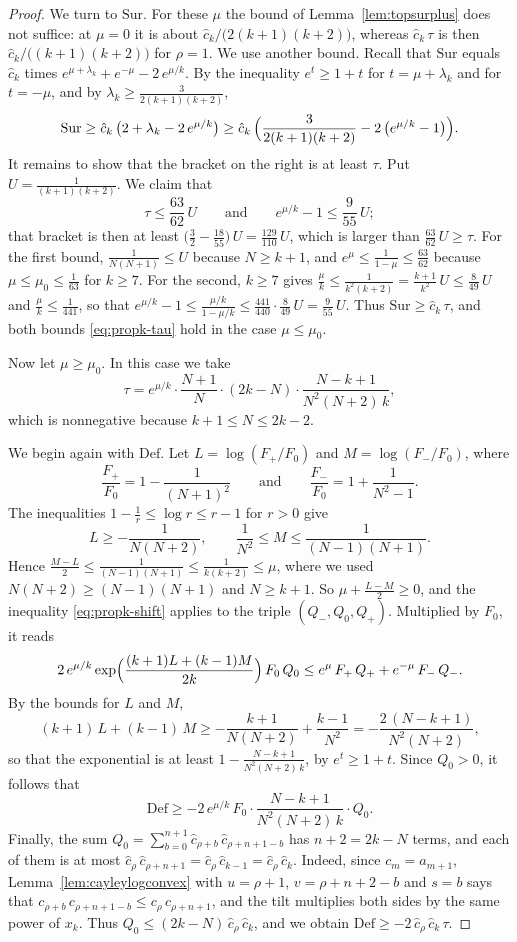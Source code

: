 \documentclass{amsart}
\theoremstyle{definition}
\theoremstyle{remark}
\numberwithin{equation}{section}
\begin{document}
\begin{proof}
We turn to $\mathrm{Sur}$. For these $\mu$ the bound of Lemma~\ref{lem:topsurplus} does not suffice: at $\mu=0$ it is about $\hat c_k/\bigl(2(k+1)(k+2)\bigr)$, whereas $\hat c_k\,\tau$ is then $\hat c_k/\bigl((k+1)(k+2)\bigr)$ for $\rho=1$. We use another bound. Recall that $\mathrm{Sur}$ equals $\hat c_k$ times $e^{\mu+\lambda_k}+e^{-\mu}-2\,e^{\mu/k}$. By the inequality $e^{t}\ge 1+t$ for $t=\mu+\lambda_k$ and for $t=-\mu$, and by $\lambda_k\ge\frac{3}{2(k+1)(k+2)}$,
\[
\mathrm{Sur}\ge\hat c_k\,\bigl(2+\lambda_k-2\,e^{\mu/k}\bigr)\ge\hat c_k\,\Bigl(\frac{3}{2(k+1)(k+2)}-2\,\bigl(e^{\mu/k}-1\bigr)\Bigr).
\]
It remains to show that the bracket on the right is at least $\tau$. Put $U=\frac{1}{(k+1)(k+2)}$. We claim that
\[
\tau\le\frac{63}{62}\,U\qquad\text{and}\qquad e^{\mu/k}-1\le\frac{9}{55}\,U;
\]
that bracket is then at least $\bigl(\frac32-\frac{18}{55}\bigr)\,U=\frac{129}{110}\,U$, which is larger than $\frac{63}{62}\,U\ge\tau$. For the first bound, $\frac{1}{N(N+1)}\le U$ because $N\ge k+1$, and $e^{\mu}\le\frac{1}{1-\mu}\le\frac{63}{62}$ because $\mu\le\mu_0\le\frac1{63}$ for $k\ge 7$. For the second, $k\ge 7$ gives $\frac{\mu}{k}\le\frac{1}{k^2(k+2)}=\frac{k+1}{k^2}\,U\le\frac{8}{49}\,U$ and $\frac{\mu}{k}\le\frac{1}{441}$, so that $e^{\mu/k}-1\le\frac{\mu/k}{1-\mu/k}\le\frac{441}{440}\cdot\frac{8}{49}\,U=\frac{9}{55}\,U$. Thus $\mathrm{Sur}\ge\hat c_k\,\tau$, and both bounds \eqref{eq:propk-tau} hold in the case $\mu\le\mu_0$.

Now let $\mu\ge\mu_0$. In this case we take
\[
\tau=e^{\mu/k}\cdot\frac{N+1}{N}\cdot(2k-N)\cdot\frac{N-k+1}{N^2(N+2)\,k},
\]
which is nonnegative because $k+1\le N\le 2k-2$.

We begin again with $\mathrm{Def}$. Let $L=\log(F_+/F_0)$ and $M=\log(F_-/F_0)$, where
\[
\frac{F_+}{F_0}=1-\frac{1}{(N+1)^2}\qquad\text{and}\qquad\frac{F_-}{F_0}=1+\frac{1}{N^2-1}.
\]
The inequalities $1-\frac1r\le\log r\le r-1$ for $r>0$ give
\[
L\ge-\frac{1}{N(N+2)},\qquad\frac{1}{N^2}\le M\le\frac{1}{(N-1)(N+1)}.
\]
Hence $\frac{M-L}{2}\le\frac{1}{(N-1)(N+1)}\le\frac{1}{k(k+2)}\le\mu$, where we used $N(N+2)\ge(N-1)(N+1)$ and $N\ge k+1$. So $\mu+\frac{L-M}{2}\ge 0$, and the inequality \eqref{eq:propk-shift} applies to the triple $(Q_-,Q_0,Q_+)$. Multiplied by $F_0$, it reads
\[
2\,e^{\mu/k}\exp\Bigl(\frac{(k+1)L+(k-1)M}{2k}\Bigr)\,F_0\,Q_0\le e^{\mu}\,F_+\,Q_++e^{-\mu}\,F_-\,Q_-.
\]
By the bounds for $L$ and $M$,
\[
(k+1)\,L+(k-1)\,M\ge-\frac{k+1}{N(N+2)}+\frac{k-1}{N^2}=-\frac{2\,(N-k+1)}{N^2(N+2)},
\]
so that the exponential is at least $1-\frac{N-k+1}{N^2(N+2)\,k}$, by $e^{t}\ge 1+t$. Since $Q_0>0$, it follows that
\[
\mathrm{Def}\ge-2\,e^{\mu/k}\,F_0\cdot\frac{N-k+1}{N^2(N+2)\,k}\cdot Q_0.
\]
Finally, the sum $Q_0=\sum_{b=0}^{n+1}\hat c_{\rho+b}\,\hat c_{\rho+n+1-b}$ has $n+2=2k-N$ terms, and each of them is at most $\hat c_\rho\,\hat c_{\rho+n+1}=\hat c_\rho\,\hat c_{k-1}=\hat c_\rho\,\hat c_k$. Indeed, since $c_m=a_{m+1}$, Lemma~\ref{lem:cayleylogconvex} with $u=\rho+1$, $v=\rho+n+2-b$ and $s=b$ says that $c_{\rho+b}\,c_{\rho+n+1-b}\le c_\rho\,c_{\rho+n+1}$, and the tilt multiplies both sides by the same power of $x_k$. Thus $Q_0\le(2k-N)\,\hat c_\rho\,\hat c_k$, and we obtain $\mathrm{Def}\ge-2\,\hat c_\rho\,\hat c_k\,\tau$.


\end{proof}
\end{document}
